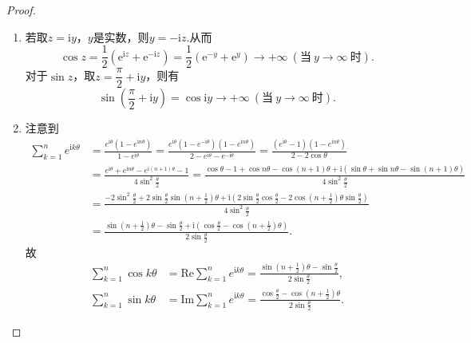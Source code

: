 \documentclass[../../main.tex]{subfiles}%
\begin{document}
\begin{proof}
\begin{enumerate}[(1)]
\item 若取$z = \text{i}y$，$y$是实数，则$y=-\text{i}z$.从而
\[
\cos z = \dfrac{1}{2}(\text{e}^{\text{i}z} + \text{e}^{-\text{i}z})
= \dfrac{1}{2}(\text{e}^{-y} + \text{e}^y)
\rightarrow +\infty \ (\text{当} \ y \rightarrow \infty \ \text{时}).
\]
对于$\sin z$，取$z = \dfrac{\pi}{2} + \text{i}y$，则有
\[
\sin\left( \dfrac{\pi}{2} + \text{i}y \right) = \cos \text{i}y \rightarrow +\infty \ (\text{当} \ y \rightarrow \infty \ \text{时}).
\]

\item 注意到
\begin{align*}
\sum_{k=1}^n{e^{\mathrm{i}k\theta}}&=\frac{e^{\mathrm{i}\theta}\left( 1-e^{\mathrm{i}n\theta} \right)}{1-e^{\mathrm{i}\theta}}=\frac{e^{\mathrm{i}\theta}\left( 1-e^{-\mathrm{i}\theta} \right) \left( 1-e^{\mathrm{i}n\theta} \right)}{2-e^{\mathrm{i}\theta}-e^{-\mathrm{i}\theta}}=\frac{\left( e^{\mathrm{i}\theta}-1 \right) \left( 1-e^{\mathrm{i}n\theta} \right)}{2-2\cos \theta}
\\
&=\frac{e^{\mathrm{i}\theta}+e^{\mathrm{i}n\theta}-e^{\mathrm{i}\left( n+1 \right) \theta}-1}{4\sin ^2\frac{\theta}{2}}=\frac{\cos \theta -1+\cos n\theta -\cos \left( n+1 \right) \theta +\mathrm{i}\left( \sin \theta +\sin n\theta -\sin \left( n+1 \right) \theta \right)}{4\sin ^2\frac{\theta}{2}}
\\
&=\frac{-2\sin ^2\frac{\theta}{2}+2\sin \frac{\theta}{2}\sin \left( n+\frac{1}{2} \right) \theta +\mathrm{i}\left( 2\sin \frac{\theta}{2}\cos \frac{\theta}{2}-2\cos \left( n+\frac{1}{2} \right) \theta \sin \frac{\theta}{2} \right)}{4\sin ^2\frac{\theta}{2}}
\\
&=\frac{\sin \left( n+\frac{1}{2} \right) \theta -\sin \frac{\theta}{2}+\mathrm{i}\left( \cos \frac{\theta}{2}-\cos \left( n+\frac{1}{2} \right) \theta \right)}{2\sin \frac{\theta}{2}}.
\end{align*}
故
\begin{align*}
\sum\limits_{k=1}^n{\cos k\theta}&=\mathrm{Re}\sum\limits_{k=1}^n{e^{\mathrm{i}k\theta}}=\frac{\sin \left( n+\frac{1}{2} \right) \theta -\sin \frac{\theta}{2}}{2\sin \frac{\theta}{2}},\\
\sum\limits_{k=1}^n{\sin k\theta}&=\mathrm{Im}\sum\limits_{k=1}^n{e^{\mathrm{i}k\theta}}=\frac{\cos \frac{\theta}{2}-\cos \left( n+\frac{1}{2} \right) \theta}{2\sin \frac{\theta}{2}}.
\end{align*}


\end{enumerate}
\end{proof}
\end{document}
